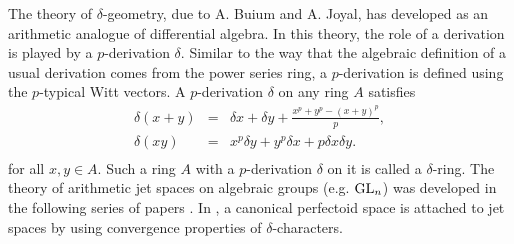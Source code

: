 \documentclass{amsart}
\numberwithin{equation}{section}
\newcommand{\beqar}{\begin{eqnarray*}}
\newcommand{\eeqar}{\end{eqnarray*}}
\def \d{\delta}
\begin{document}
%
 
%


%


The theory of $\d$-geometry, due to A. Buium and A. Joyal, has developed as an 
arithmetic analogue of 
differential algebra. In this theory, the role of a derivation is played by
a $p$-derivation $\d$. Similar to the way that the algebraic definition of a 
usual 
derivation comes from the power series ring, a $p$-derivation is defined using 
the $p$-typical Witt vectors. A $p$-derivation $\d$ on any ring $A$ satisfies
\beqar
\d(x + y) & = & \d x + \d y + \frac{x^p + y^p -(x+y)^p}{p}, \\
\d (xy) & = & x^p \d y + y^p \d x + p\d x \d y. \\
\eeqar
for all $x,y \in A$.
Such a ring $A$ with a $p$-derivation $\d$ on it is called a $\d$-ring. 
The theory of arithmetic jet spaces on algebraic groups (e.g. ${\mathrm{GL}}_n$) 
was developed in the following series of papers \cite{MR3473428,MR3477327,
MR3477328}. In \cite{buium2019perfectoid}, a canonical perfectoid space
is attached to jet spaces by using convergence properties of 
$\d$-characters.
\end{document}
